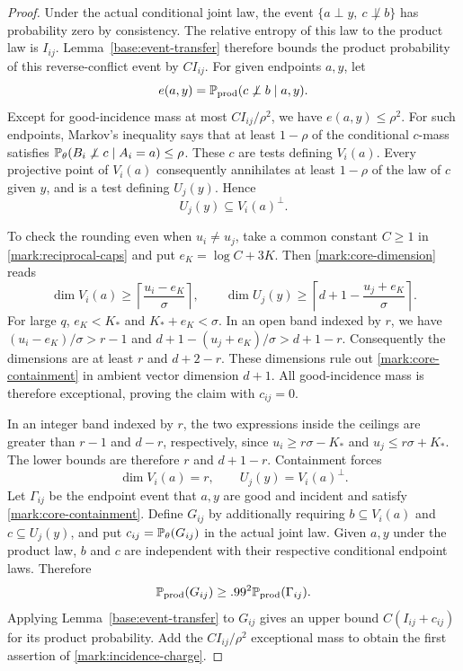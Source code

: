 \begin{proof}
Under the actual conditional joint law, the event
$\{a\perp y,\ c\not\perp b\}$ has probability zero by consistency.
The relative entropy of this law to the product law is $I_{ij}$.
Lemma~\ref{base:event-transfer} therefore bounds the product
probability of this reverse-conflict event by $CI_{ij}$.
For given endpoints $a,y$, let
\[
 e(a,y)=\mathbb P_{\mathrm{prod}}(c\not\perp b\mid a,y).
\]
Except for good-incidence mass at most $CI_{ij}/\rho^2$, we have
$e(a,y)\le\rho^2$. For such endpoints, Markov's inequality says
that at least $1-\rho$ of the conditional $c$-mass satisfies
$\mathbb P_\theta(B_i\not\perp c\mid A_i=a)\le\rho$.
These $c$ are tests defining $V_i(a)$. Every projective point of
$V_i(a)$ consequently annihilates at least $1-\rho$ of the law of
$c$ given $y$, and is a test defining $U_j(y)$. Hence
\begin{equation}\label{mark:core-containment}
 U_j(y)\subseteq V_i(a)^\perp.
\end{equation}

To check the rounding even when $u_i\ne u_j$, take a common constant
$C\ge1$ in \eqref{mark:reciprocal-caps} and put $e_K=\log C+3K$.
Then \eqref{mark:core-dimension} reads
\[
 \dim V_i(a)\ge\left\lceil\frac{u_i-e_K}{\sigma}\right\rceil,
 \qquad
 \dim U_j(y)\ge\left\lceil d+1-\frac{u_j+e_K}{\sigma}\right\rceil.
\]
For large $q$, $e_K<K_*$ and $K_*+e_K<\sigma$.
In an open band indexed by $r$, we have
$(u_i-e_K)/\sigma>r-1$ and
$d+1-(u_j+e_K)/\sigma>d+1-r$.
Consequently the dimensions are at least $r$ and $d+2-r$.
These dimensions rule out
\eqref{mark:core-containment} in ambient vector dimension $d+1$.
All good-incidence mass is therefore exceptional, proving the claim
with $c_{ij}=0$.

In an integer band indexed by $r$, the two expressions inside the
ceilings are greater than $r-1$ and $d-r$, respectively, since
$u_i\ge r\sigma-K_*$ and $u_j\le r\sigma+K_*$.
The lower bounds are therefore $r$ and $d+1-r$. Containment forces
\begin{equation}\label{mark:complementary-cores}
 \dim V_i(a)=r,\qquad U_j(y)=V_i(a)^\perp.
\end{equation}
Let $\Gamma_{ij}$ be the endpoint event that $a,y$ are good and
incident and satisfy \eqref{mark:core-containment}. Define $G_{ij}$
by additionally requiring $b\subseteq V_i(a)$ and $c\subseteq U_j(y)$,
and put $c_{ij}=\mathbb P_\theta(G_{ij})$ in the actual joint law.
Given $a,y$ under the product law, $b$ and $c$ are independent with
their respective conditional endpoint laws. Therefore
\[
 \mathbb P_{\mathrm{prod}}(G_{ij})\ge .99^2
                 \mathbb P_{\mathrm{prod}}(\Gamma_{ij}).
\]
Applying Lemma~\ref{base:event-transfer} to $G_{ij}$ gives an upper
bound $C(I_{ij}+c_{ij})$ for its product probability. Add the
$CI_{ij}/\rho^2$ exceptional mass to obtain the first assertion
of \eqref{mark:incidence-charge}.


\end{proof}
